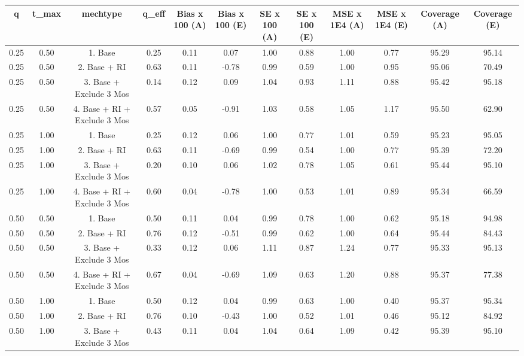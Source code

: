 \documentclass{article}
\begin{document}
\begin{table}[ht]
\centering
\begin{tabular}{cccccccccccc}
  \hline
q & t\_max & mechtype & q\_eff & Bias x 100 (A) & Bias x 100 (E) & SE x 100 (A) & SE x 100 (E) & MSE x 1E4 (A) & MSE x 1E4 (E) & Coverage (A) & Coverage (E) \\ 
  \hline 
 \hline
0.25 & 0.50 & 1. Base & 0.25 & 0.11 & 0.07 & 1.00 & 0.88 & 1.00 & 0.77 & 95.29 & 95.14 \\ 
  0.25 & 0.50 & 2. Base + RI & 0.63 & 0.11 & -0.78 & 0.99 & 0.59 & 1.00 & 0.95 & 95.06 & 70.49 \\ 
  0.25 & 0.50 & 3. Base + Exclude 3 Mos & 0.14 & 0.12 & 0.09 & 1.04 & 0.93 & 1.11 & 0.88 & 95.42 & 95.18 \\ 
  0.25 & 0.50 & 4. Base + RI + Exclude 3 Mos & 0.57 & 0.05 & -0.91 & 1.03 & 0.58 & 1.05 & 1.17 & 95.50 & 62.90 \\ 
   \hline 
0.25 & 1.00 & 1. Base & 0.25 & 0.12 & 0.06 & 1.00 & 0.77 & 1.01 & 0.59 & 95.23 & 95.05 \\ 
  0.25 & 1.00 & 2. Base + RI & 0.63 & 0.11 & -0.69 & 0.99 & 0.54 & 1.00 & 0.77 & 95.39 & 72.20 \\ 
  0.25 & 1.00 & 3. Base + Exclude 3 Mos & 0.20 & 0.10 & 0.06 & 1.02 & 0.78 & 1.05 & 0.61 & 95.44 & 95.10 \\ 
  0.25 & 1.00 & 4. Base + RI + Exclude 3 Mos & 0.60 & 0.04 & -0.78 & 1.00 & 0.53 & 1.01 & 0.89 & 95.34 & 66.59 \\ 
   \hline 
0.50 & 0.50 & 1. Base & 0.50 & 0.11 & 0.04 & 0.99 & 0.78 & 1.00 & 0.62 & 95.18 & 94.98 \\ 
  0.50 & 0.50 & 2. Base + RI & 0.76 & 0.12 & -0.51 & 0.99 & 0.62 & 1.00 & 0.64 & 95.44 & 84.43 \\ 
  0.50 & 0.50 & 3. Base + Exclude 3 Mos & 0.33 & 0.12 & 0.06 & 1.11 & 0.87 & 1.24 & 0.77 & 95.33 & 95.13 \\ 
  0.50 & 0.50 & 4. Base + RI + Exclude 3 Mos & 0.67 & 0.04 & -0.69 & 1.09 & 0.63 & 1.20 & 0.88 & 95.37 & 77.38 \\ 
   \hline 
0.50 & 1.00 & 1. Base & 0.50 & 0.12 & 0.04 & 0.99 & 0.63 & 1.00 & 0.40 & 95.37 & 95.34 \\ 
  0.50 & 1.00 & 2. Base + RI & 0.76 & 0.10 & -0.43 & 1.00 & 0.52 & 1.01 & 0.46 & 95.12 & 84.92 \\ 
  0.50 & 1.00 & 3. Base + Exclude 3 Mos & 0.43 & 0.11 & 0.04 & 1.04 & 0.64 & 1.09 & 0.42 & 95.39 & 95.10 \\ 

\end{tabular}
\end{table}
\end{document}
